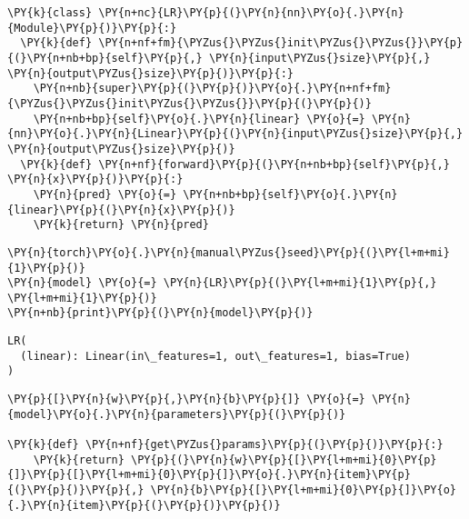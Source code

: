     \begin{tcolorbox}[breakable, size=fbox, boxrule=1pt, pad at break*=1mm,colback=cellbackground, colframe=cellborder]
\begin{Verbatim}[commandchars=\\\{\}]
\PY{k}{class} \PY{n+nc}{LR}\PY{p}{(}\PY{n}{nn}\PY{o}{.}\PY{n}{Module}\PY{p}{)}\PY{p}{:}
  \PY{k}{def} \PY{n+nf+fm}{\PYZus{}\PYZus{}init\PYZus{}\PYZus{}}\PY{p}{(}\PY{n+nb+bp}{self}\PY{p}{,} \PY{n}{input\PYZus{}size}\PY{p}{,} \PY{n}{output\PYZus{}size}\PY{p}{)}\PY{p}{:}
    \PY{n+nb}{super}\PY{p}{(}\PY{p}{)}\PY{o}{.}\PY{n+nf+fm}{\PYZus{}\PYZus{}init\PYZus{}\PYZus{}}\PY{p}{(}\PY{p}{)}
    \PY{n+nb+bp}{self}\PY{o}{.}\PY{n}{linear} \PY{o}{=} \PY{n}{nn}\PY{o}{.}\PY{n}{Linear}\PY{p}{(}\PY{n}{input\PYZus{}size}\PY{p}{,} \PY{n}{output\PYZus{}size}\PY{p}{)}
  \PY{k}{def} \PY{n+nf}{forward}\PY{p}{(}\PY{n+nb+bp}{self}\PY{p}{,} \PY{n}{x}\PY{p}{)}\PY{p}{:}
    \PY{n}{pred} \PY{o}{=} \PY{n+nb+bp}{self}\PY{o}{.}\PY{n}{linear}\PY{p}{(}\PY{n}{x}\PY{p}{)}
    \PY{k}{return} \PY{n}{pred}
\end{Verbatim}
\end{tcolorbox}

    \begin{tcolorbox}[breakable, size=fbox, boxrule=1pt, pad at break*=1mm,colback=cellbackground, colframe=cellborder]
\begin{Verbatim}[commandchars=\\\{\}]
\PY{n}{torch}\PY{o}{.}\PY{n}{manual\PYZus{}seed}\PY{p}{(}\PY{l+m+mi}{1}\PY{p}{)}
\PY{n}{model} \PY{o}{=} \PY{n}{LR}\PY{p}{(}\PY{l+m+mi}{1}\PY{p}{,} \PY{l+m+mi}{1}\PY{p}{)}
\PY{n+nb}{print}\PY{p}{(}\PY{n}{model}\PY{p}{)}
\end{Verbatim}
\end{tcolorbox}

    \begin{Verbatim}[commandchars=\\\{\}]
LR(
  (linear): Linear(in\_features=1, out\_features=1, bias=True)
)
    \end{Verbatim}

    \begin{tcolorbox}[breakable, size=fbox, boxrule=1pt, pad at break*=1mm,colback=cellbackground, colframe=cellborder]
\begin{Verbatim}[commandchars=\\\{\}]
\PY{p}{[}\PY{n}{w}\PY{p}{,}\PY{n}{b}\PY{p}{]} \PY{o}{=} \PY{n}{model}\PY{o}{.}\PY{n}{parameters}\PY{p}{(}\PY{p}{)}

\PY{k}{def} \PY{n+nf}{get\PYZus{}params}\PY{p}{(}\PY{p}{)}\PY{p}{:}
    \PY{k}{return} \PY{p}{(}\PY{n}{w}\PY{p}{[}\PY{l+m+mi}{0}\PY{p}{]}\PY{p}{[}\PY{l+m+mi}{0}\PY{p}{]}\PY{o}{.}\PY{n}{item}\PY{p}{(}\PY{p}{)}\PY{p}{,} \PY{n}{b}\PY{p}{[}\PY{l+m+mi}{0}\PY{p}{]}\PY{o}{.}\PY{n}{item}\PY{p}{(}\PY{p}{)}\PY{p}{)}
\end{Verbatim}
\end{tcolorbox}


